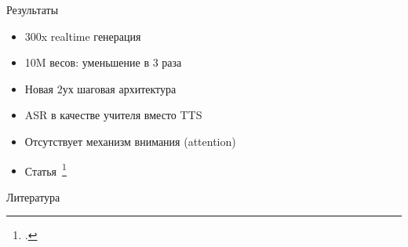 \begin{frame}{Результаты}
\begin{itemize}
    \item $300$x realtime генерация
    \item 10M весов: уменьшение в 3 раза
    \item Новая 2ух шаговая архитектура
    \item ASR в качестве учителя вместо TTS
    \item Отсутствует механизм внимания (attention)
    \item Статья~\footcite{beliaev2020talknet}
\end{itemize}
\end{frame}

\begin{frame}{Литература}
\printbibliography[heading=none]
\end{frame}

